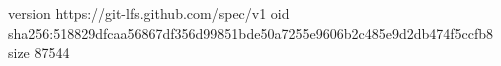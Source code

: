 version https://git-lfs.github.com/spec/v1
oid sha256:518829dfcaa56867df356d99851bde50a7255e9606b2c485e9d2db474f5ccfb8
size 87544
